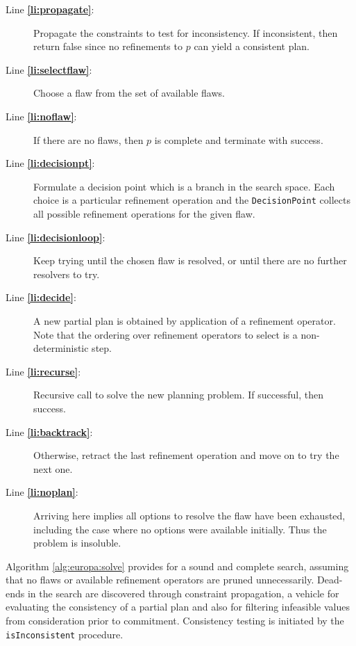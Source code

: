 \begin{description}

\item[Line \textbf{\ref{li:propagate}}:] Propagate the constraints to
  test for inconsistency. If inconsistent, then return false since no
  refinements to $p$ can yield a consistent plan.

\item[Line \textbf{\ref{li:selectflaw}}:] Choose a flaw from the set
  of available flaws.

\item[Line \textbf{\ref{li:noflaw}}:] If there are no flaws, then $p$
  is complete and terminate with success.

\item[Line \textbf{\ref{li:decisionpt}}:] Formulate a decision point
  which is a branch in the search space. Each choice is a particular
  refinement operation and the \texttt{DecisionPoint} collects all
  possible refinement operations for the given flaw.

\item[Line \textbf{\ref{li:decisionloop}}:] Keep trying until the
  chosen flaw is resolved, or until there are no further resolvers to
  try.

\item[Line \textbf{\ref{li:decide}}:] A new partial plan is obtained
  by application of a refinement operator. Note that the ordering over
  refinement operators to select is a non-deterministic step.

\item[Line \textbf{\ref{li:recurse}}:] Recursive call to solve the
  new planning problem. If successful, then success.

\item[Line \textbf{\ref{li:backtrack}}:] Otherwise, retract the last
  refinement operation and move on to try the next one.

\item[Line \textbf{\ref{li:noplan}}:] Arriving here implies all
  options to resolve the flaw have been exhausted, including the case
  where no options were available initially. Thus the problem is
  insoluble.

\end{description}

Algorithm \ref{alg:europa:solve} provides for a sound and complete
search, assuming that no flaws or available refinement operators are
pruned unnecessarily.  Dead-ends in the search are discovered through
constraint propagation, a vehicle for evaluating the consistency of a
partial plan and also for filtering infeasible values from
consideration prior to commitment. Consistency testing is initiated by
the \texttt{isInconsistent} procedure.

